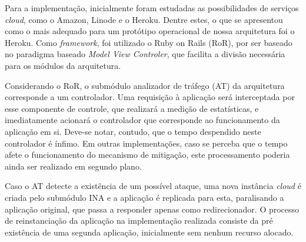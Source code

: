 Para a implementação, inicialmente foram estudadas as possibilidades de serviços \emph{cloud}, como o Amazon, Linode e o Heroku. Dentre estes, o que se apresentou como o mais adequado para um protótipo operacional de nossa arquitetura foi o Heroku. %
%
%
Como \emph{framework}, foi utilizado o Ruby on Rails (RoR),  por ser baseado no paradigma baseado \emph{Model View Controler}, que facilita a divisão necessária para os módulos da arquitetura. 

Considerando o RoR, o submódulo analizador de tráfego (AT) da arquitetura corresponde a um controlador. Uma requisição à aplicação será interceptada por esse componente de controle, que realizará a medição de estatísticas, e imediatamente acionará o controlador que corresponde ao funcionamento da aplicação em si. Deve-se notar, contudo, que o tempo despendido neste controlador é ínfimo. Em outras implementações, caso se perceba que o tempo afete o funcionamento do mecanismo de mitigação, este processamento poderia ainda ser realizado em segundo plano.

Caso o AT detecte a existência de um possível ataque, uma nova instância \emph{cloud} é criada pelo submódulo INA e a aplicação é replicada para esta, paralisando a aplicação original, que passa a responder apenas como redirecionador. O processo de reinstanciação da aplicação na implementação realizada consiste da pré existência de uma segunda aplicação, inicialmente sem nenhum recurso alocado. %


